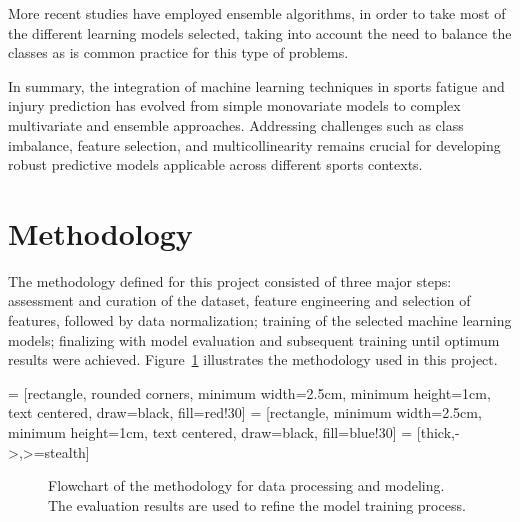 \documentclass[conference]{IEEEtran}
\begin{document}
More recent studies have employed ensemble algorithms, in order to take most of the different learning models selected, taking into account the need to balance the classes as is common practice for this type of problems. 

In summary, the integration of machine learning techniques in sports fatigue and injury prediction has evolved from simple monovariate models to complex multivariate and ensemble approaches. Addressing challenges such as class imbalance, feature selection, and multicollinearity remains crucial for developing robust predictive models applicable across different sports contexts.

\section{Methodology}

The methodology defined for this project consisted of three major steps: assessment and curation of the dataset, feature engineering and selection of features, followed by data normalization; training of the selected machine learning models; finalizing with model evaluation and subsequent training until optimum results were achieved. Figure~\ref{fig:methodology} illustrates the methodology used in this project.

 = [rectangle, rounded corners, minimum width=2.5cm, minimum height=1cm, text centered, draw=black, fill=red!30]
 = [rectangle, minimum width=2.5cm, minimum height=1cm, text centered, draw=black, fill=blue!30]
 = [thick,->,>=stealth]

\begin{figure}[h]
\centering
{}
\caption{Flowchart of the methodology for data processing and modeling. The evaluation results are used to refine the model training process.}
\label{fig:methodology}
\end{figure}
\end{document}
